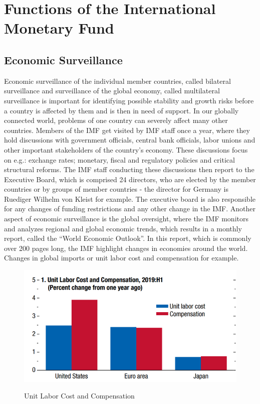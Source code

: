 \section{Functions of the International Monetary Fund}
\label{sec:functions}

\subsection{Economic Surveillance}
Economic surveillance of the individual member countries, called bilateral surveillance and surveillance of the global economy, called multilateral surveillance is important for identifying possible stability and growth risks before a country is affected by them and is then in need of support. In our globally connected world, problems of one country can severely affect many other countries. Members of the \gls{IMF} get visited by \gls{IMF} staff once a year, where they hold discussions with government officials, central bank officials, labor unions and other important stakeholders of the country’s economy. These discussions focus on e.g.: exchange rates; monetary, fiscal and regulatory policies and critical structural reforms. The \gls{IMF} staff conducting these discussions then report to the Executive Board, which is comprised 24 directors, who are elected by the member countries or by groups of member countries - the director for Germany is Ruediger Wilhelm von Kleist for example. The executive board is also responsible for any changes of funding restrictions and any other change in the \gls{IMF}. Another aspect of economic surveillance is the global oversight, where the \gls{IMF} monitors and analyzes regional and global economic trends, which results in a monthly report, called the \enquote{World Economic Outlook}. In this report, which is commonly over 200 pages long, the \gls{IMF} highlight changes in economies around the world. Changes in global imports or unit labor cost and compensation for example.

\begin{figure}[!ht]
\centering
\begin{minipage}[t]{.7\textwidth} %
\caption{Unit Labor Cost and Compensation} %
\includegraphics[width=1\textwidth]{img/laborcostcompensation.png}\\ %
\label{fig:weoexample1}
\end{minipage}
\end{figure}

